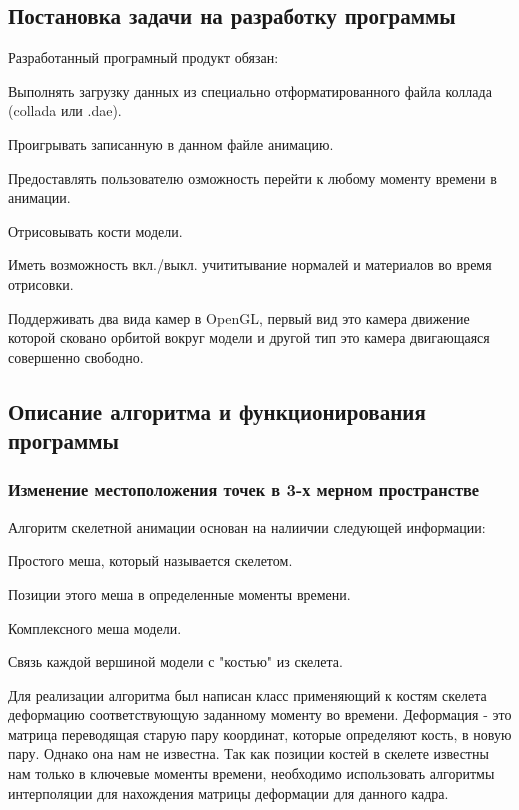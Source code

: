 \subsection{Постановка задачи на разработку программы}
Разработанный програмный продукт обязан:
\begin{my_enumerate}
\item Выполнять загрузку данных из специально отформатированного файла коллада (collada или .dae).
\item Проигрывать записанную в данном файле анимацию.
\item Предоставлять пользователю озможность перейти к любому моменту времени в анимации.
\item Отрисовывать кости модели.
\item Иметь возможность вкл./выкл. учититывание нормалей и материалов во время отрисовки.
\item Поддерживать два вида камер в OpenGL, первый вид это камера движение которой сковано орбитой вокруг модели и другой тип это камера двигающаяся совершенно свободно.
\end{my_enumerate}


\subsection{Описание алгоритма и функционирования программы}

\subsubsection{Изменение местоположения точек в 3-х мерном пространстве}




Алгоритм скелетной анимации основан на налиичии следующей информации:
\begin{my_enumerate}
\item Простого меша, который называется скелетом.
\item Позиции этого меша в определенные моменты времени.
\item Комплексного меша модели.
\item Связь каждой вершиной модели с "костью" из скелета.
\end{my_enumerate}

Для реализации алгоритма был написан класс применяющий к костям скелета деформацию соответствующую заданному моменту во времени. Деформация - это матрица переводящая старую пару координат, которые определяют кость, в новую пару. Однако она нам не известна. Так как позиции костей в скелете известны нам только в ключевые моменты времени, необходимо использовать алгоритмы интерполяции для нахождения матрицы деформации для данного кадра. 


